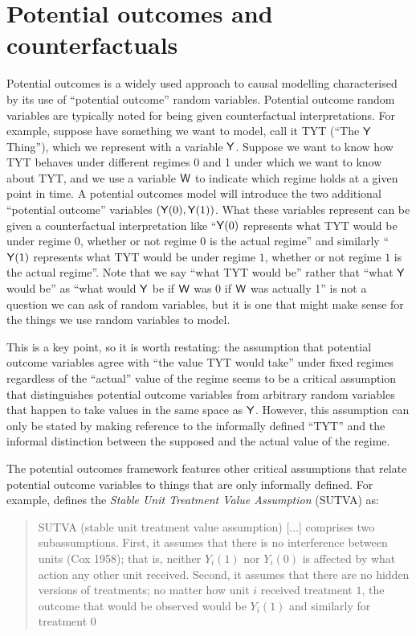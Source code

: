 

\section{Potential outcomes and counterfactuals}

Potential outcomes is a widely used approach to causal modelling characterised by its use of ``potential outcome'' random variables. Potential outcome random variables are typically noted for being given counterfactual interpretations. For example, suppose have something we want to model, call it TYT (``The $\mathsf{Y}$ Thing''), which we represent with a variable $\mathsf{Y}$. Suppose we want to know how TYT behaves under different regimes 0 and 1 under which we want to know about TYT, and we use a variable $\mathsf{W}$ to indicate which regime holds at a given point in time. A potential outcomes model will introduce the two additional ``potential outcome'' variables $(\mathsf{Y}(0), \mathsf{Y}(1))$. What these variables represent can be given a counterfactual interpretation like ``$\mathsf{Y}(0)$ represents what TYT would be under regime $0$, whether or not regime $0$ is the actual regime'' and similarly ``$\mathsf{Y}(1)$ represents what TYT would be under regime $1$, whether or not regime $1$ is the actual regime''. Note that we say ``what TYT would be'' rather that ``what $\mathsf{Y}$ would be'' as ``what would $\mathsf{Y}$ be if $\mathsf{W}$ was 0 if $\mathsf{W}$ was actually 1'' is not a question we can ask of random variables, but it is one that might make sense for the things we use random variables to model.

This is a key point, so it is worth restating: the assumption that potential outcome variables agree with ``the value TYT would take'' under fixed regimes regardless of the ``actual'' value of the regime seems to be a critical assumption that distinguishes potential outcome variables from arbitrary random variables that happen to take values in the same space as $\mathsf{Y}$. However, this assumption can only be stated by making reference to the informally defined ``TYT'' and the informal distinction between the supposed and the actual value of the regime.

The potential outcomes framework features other critical assumptions that relate potential outcome variables to things that are only informally defined. For example, \citet{rubin_causal_2005} defines the \emph{Stable Unit Treatment Value Assumption} (SUTVA) as:

\begin{quote}
SUTVA (stable unit treatment value assumption) [...] comprises two subassumptions. First, it assumes that there is no interference between units (Cox 1958); that is, neither $Y_i(1)$ nor $Y_i(0)$ is affected by what action any other unit received. Second, it assumes that there are no hidden versions of treatments; no matter how unit $i$ received treatment $1$, the outcome that would be observed would be $Y_i(1)$ and similarly for treatment $0$
\end{quote}

